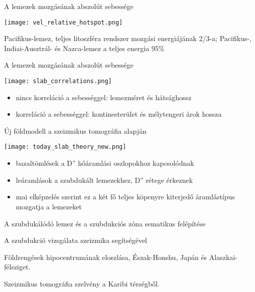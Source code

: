 \documentclass{beamer}
\begin{document}
\begin{frame}{A lemezek mozgásának abszolút sebessége}
    \begin{center}
        \texttt{[image: vel\_relative\_hotspot.png]}
    \end{center}
    Pacifikus-lemez, teljes litoszféra rendszer mozgási energiájának 2/3-a; Pacifikus-, Indiai-Ausztrál- és Nazca-lemez a teljes energia 95\%
\end{frame}


\begin{frame}{A lemezek mozgásának abszolút sebessége}
    \begin{center}
        \texttt{[image: slab\_correlations.png]}
    \end{center}
    \begin{itemize}
        \item nincs korreláció a sebességgel: lemezméret és hátsághossz
        \item korreláció a sebességgel: kontinesterület és mélytengeri árok hossza
    \end{itemize}
\end{frame}


\begin{frame}{Új földmodell a szeizmikus tomográfia alapján}
    \begin{center}
        \texttt{[image: today\_slab\_theory\_new.png]}
    \end{center}
    \begin{itemize}
        \item bazaltömlések a D'' hőáramlási oszlopokhoz kapcsolódnak
        \item leáramlások a szubdukált lemezekhez, D'' rétege érkeznek
        \item mai elképzelés szerint ez a két fő teljes köpenyre kiterjedő áramlástípus mozgatja a lemezeket
    \end{itemize}
\end{frame}


\begin{frame}{A szubdukálódó lemez és a szubdukciós zóna sematikus felépítése}
    \begin{minic}{0.88}
    \end{minic}
\end{frame}


\begin{frame}{A szubdukció vizsgálata szeizmika segítségével}
    \begin{minipage}[c]{0.45\textwidth}
        \centering
        
        Földrengések hipocentrumának eloszlása, Észak-Honshu, Japán és Alaszkai-félsziget. \cite{abers}
    \end{minipage}
    \hspace{10pt}
    \begin{minipage}[c]{0.45\textwidth}
        \centering
        
        Szeizmikus tomográfia szelvény a Karibi térségből.
    \end{minipage}
\end{frame}
\end{document}
